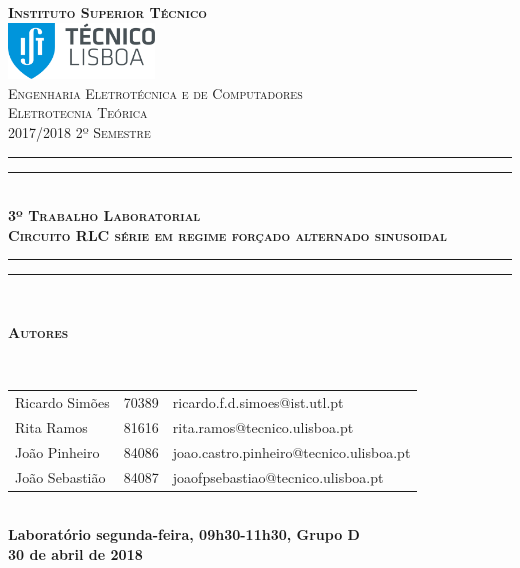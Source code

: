 \documentclass[a4paper, titlepage, portuguese]{article}
\begin{document}
	\begin{titlepage}
		\center
		\textsc{\bfseries\LARGE Instituto Superior Técnico}\\[1cm] %
		\includegraphics[height=1.5cm]{IST_Logo.pdf}\\[2.5cm]

		\textsc{\large Engenharia Eletrotécnica e de Computadores}\\[0.5cm] %
		\textsc{\Large Eletrotecnia Teórica}\\[0.5cm] %
		\textsc{\large 2017/2018 2º Semestre}\\[2cm]

		\rule{\textwidth}{1.6pt}\vspace*{-\baselineskip}\vspace*{2pt} %
		\rule{\textwidth}{0.4pt}\\[\baselineskip] %
			\textsc{\Huge \bfseries 3º Trabalho Laboratorial}\\[0.2cm]
			\bigskip
			\textsc{\large \bfseries Circuito RLC série em regime forçado alternado sinusoidal}\\[0.2cm]
		\rule{\textwidth}{0.4pt}\vspace*{-\baselineskip}\vspace{3.2pt} %
		\rule{\textwidth}{1.6pt}\\[5cm]

		\begin{minipage}{0.9\textwidth}
			\begin{flushleft} \large
				\begin{Large}\bfseries\textsc{Autores}\end{Large}\\[0.4cm]
				\begin{tabular}{l l l}
					Ricardo Simões	& 70389 & \normalsize ricardo.f.d.simoes@ist.utl.pt \\
					Rita Ramos			& 81616 & \normalsize rita.ramos@tecnico.ulisboa.pt \\
					João Pinheiro		& 84086 & \normalsize joao.castro.pinheiro@tecnico.ulisboa.pt \\
					João Sebastião	& 84087 & \normalsize joaofpsebastiao@tecnico.ulisboa.pt \\
				\end{tabular}
			\end{flushleft}
		\end{minipage}\\[0.5cm]

		\large \bfseries Laboratório segunda-feira, 09h30-11h30, Grupo D\\
		\large 30 de abril de 2018\\[1cm]
		\setcounter{page}{0}
	\end{titlepage}
\end{document}
